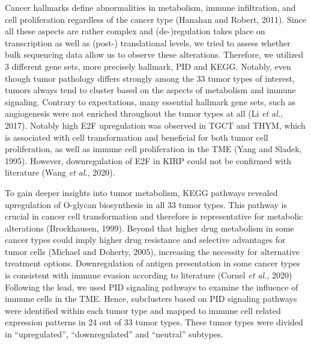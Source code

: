 \documentclass[
  parskip,
  oneside]{scrreprt}
\begin{document}
Cancer hallmarks define abnormalities in metabolism, immune
infiltration, and cell proliferation regardless of the cancer type
(Hanahan and Robert, 2011). Since all these aspects are rather complex
and (de-)regulation takes place on transcription as well as (post-)
translational levels, we tried to assess whether bulk sequencing data
allow us to observe these alterations. Therefore, we utilized 3
different gene sets, more precisely hallmark, PID and KEGG. Notably,
even though tumor pathology differs strongly among the 33 tumor types of
interest, tumors always tend to cluster based on the aspects of
metabolism and immune signaling. Contrary to expectations, many
essential hallmark gene sets, such as angiogenesis were not enriched
throughout the tumor types at all (Li \emph{et al.}, 2017). Notably high
E2F upregulation was observed in TGCT and THYM, which is associated with
cell transformation and beneficial for both tumor cell proliferation, as
well as immune cell proliferation in the TME (Yang and Sladek, 1995).
However, downregulation of E2F in KIRP could not be confirmed with
literature (Wang \emph{et al.}, 2020).

To gain deeper insights into tumor metabolism, KEGG pathways revealed
upregulation of O-glycan biosynthesis in all 33 tumor types. This
pathway is crucial in cancer cell transformation and therefore is
representative for metabolic alterations (Brockhausen, 1999). Beyond
that higher drug metabolism in some cancer types could imply higher drug
resistance and selective advantages for tumor cells (Michael and
Doherty, 2005), increasing the necessity for alternative treatment
options. Downregulation of antigen presentation in some cancer types is
consistent with immune evasion according to literature (Cornel \emph{et
al.}, 2020) Following the lead, we used PID signaling pathways to
examine the influence of immune cells in the TME. Hence, subclusters
based on PID signaling pathways were identified within each tumor type
and mapped to immune cell related expression patterns in 24 out of 33
tumor types. These tumor types were divided in ``upregulated'',
``downregulated'' and ``neutral'' subtypes.
\end{document}
